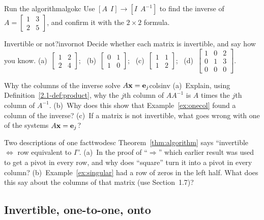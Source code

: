 \documentclass[11pt]{article}
\begin{document}
\begin{kc}{Run the algorithm}{algokc}
Use $[A\ \ I]\to[I\ \ A^{-1}]$ to find the inverse of $A=\begin{bmatrix}1&3\\2&5\end{bmatrix}$, and confirm it with the $2\times2$ formula.
\end{kc}

\begin{kc}{Invertible or not?}{invornot}
Decide whether each matrix is invertible, and say how you know. (a)~$\begin{bmatrix}1&2\\2&4\end{bmatrix}$; \ (b)~$\begin{bmatrix}0&1\\1&0\end{bmatrix}$; \ (c)~$\begin{bmatrix}1&1\\1&2\end{bmatrix}$; \ (d)~$\begin{bmatrix}1&0&2\\0&1&3\\0&0&0\end{bmatrix}$.
\end{kc}

\begin{think}{Why the columns of the inverse solve $A\mathbf{x}=\mathbf{e}_j$}{colsinv}
(a)~Explain, using Definition~\ref{2.1-def:product}, why the $j$th column of $AA^{-1}$ is $A$ times the $j$th column of $A^{-1}$. (b)~Why does this show that Example~\ref{ex:onecol} found a column of the inverse? (c)~If a matrix is not invertible, what goes wrong with one of the systems $A\mathbf{x}=\mathbf{e}_j$?
\end{think}

\begin{think}{Two descriptions of one fact}{twodesc}
Theorem~\ref{thm:algorithm} says ``invertible $\iff$ row equivalent to $I$''. (a)~In the proof of ``$\Rightarrow$'' which earlier result was used to get a pivot in every row, and why does ``square'' turn it into a pivot in every column? (b)~Example~\ref{ex:singular} had a row of zeros in the left half. What does this say about the columns of that matrix (use Section~1.7)?
\end{think}

\subsection*{Invertible, one-to-one, onto}
\end{document}

